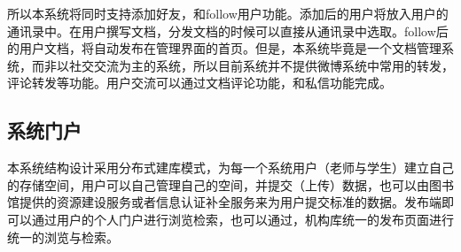 所以本系统将同时支持添加好友，和follow用户功能。添加后的用户将放入用户的通讯录中。在用户撰写文档，分发文档的时候可以直接从通讯录中选取。follow后的用户文档，将自动发布在管理界面的首页。但是，本系统毕竟是一个文档管理系统，而非以社交交流为主的系统，所以目前系统并不提供微博系统中常用的转发，评论转发等功能。用户交流可以通过文档评论功能，和私信功能完成。

\subsection{系统门户}
\label{sec:golbal}

本系统结构设计采用分布式建库模式，为每一个系统用户（老师与学生）建立自己的存储空间，用户可以自己管理自己的空间，并提交（上传）数据，也可以由图书馆提供的资源建设服务或者信息认证补全服务来为用户提交标准的数据。发布端即可以通过用户的个人门户进行浏览检索，也可以通过，机构库统一的发布页面进行统一的浏览与检索。

